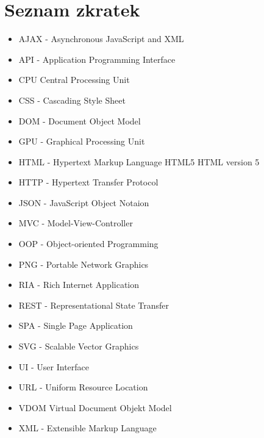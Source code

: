 \appendix
{}


\chapter*{Seznam zkratek}
\begin{itemize}
\item AJAX - Asynchronous JavaScript and XML
\item API - Application Programming Interface
\item CPU Central Processing Unit
\item CSS - Cascading Style Sheet
\item DOM - Document Object Model
\item GPU - Graphical Processing Unit
\item HTML - Hypertext Markup Language HTML5 HTML version 5
\item HTTP - Hypertext Transfer Protocol
\item JSON - JavaScript Object Notaion
\item MVC - Model-View-Controller
\item OOP -  Object-oriented Programming
\item PNG - Portable Network Graphics
\item RIA - Rich Internet Application
\item REST - Representational State Transfer
\item SPA - Single Page Application
\item SVG - Scalable Vector Graphics
\item UI - User Interface
\item URL - Uniform Resource Location
\item VDOM Virtual Document Objekt Model
\item XML - Extensible Markup Language
\end{itemize}